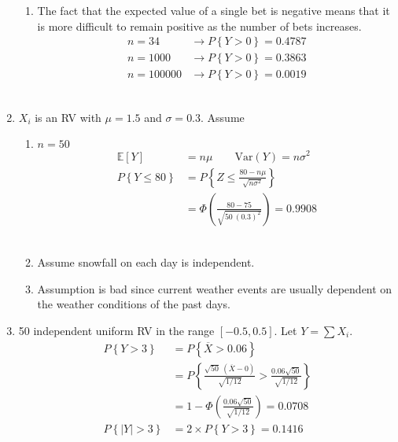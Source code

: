 \begin{enumerate}
\begin{enumerate}
			\item The fact that the expected value of a single bet is negative means that it is more difficult to remain positive as the number of bets increases.
			\begin{align}
				n = 34 &\to P \left\{ Y > 0 \right\} = 0.4787 \nonumber \\
				n = 1000 &\to P \left\{ Y > 0 \right\} = 0.3863 \nonumber \\
				n = 100000 &\to P \left\{ Y > 0 \right\} = 0.0019 \nonumber
			\end{align}\\
		\end{enumerate}
	 
	
	\item $ X_i $ is an RV with $ \mu = 1.5 $ and $ \sigma = 0.3 $. Assume \\
	
		\begin{enumerate}
			\item $ n = 50 $
			\begin{align}
				\mathbb{E}[Y] &= n\mu \qquad \mathrm{Var}(Y) = n\sigma^2 \nonumber \\
				P \left\{ Y \leq 80 \right\} &= P \left\{Z \leq \frac{80 - n\mu}{\sqrt{n\sigma^2}} \right\} \nonumber \\
				&= \Phi \left(\frac{80 - 75}{\sqrt{50\ (0.3)^2}}\right) = 0.9908
			\end{align}\\
			
			\item Assume snowfall on each day is independent.\\
			
			\item Assumption is bad since current weather events are usually dependent on the weather conditions of the past days.\\
			
		\end{enumerate}
	 
	
	\item 50 independent uniform RV in the range $ [-0.5, 0.5] $. Let $ Y = \sum X_i  $. \\
	
		\begin{align}
			P \left\{Y > 3 \right\} &= P \left\{ \overline{X} > 0.06 \right\} \nonumber \\
			&= P \left\{ \frac{\sqrt{50}\ (\overline{X} - 0)}{\sqrt{1/12}}> \frac{0.06 \sqrt{50}}{\sqrt{1/12}} \right\} \nonumber \\
			&= 1 - \Phi\left( \frac{0.06 \sqrt{50}}{\sqrt{1/12}} \right) = 0.0708 \nonumber \\
			P \left\{|Y| > 3 \right\} &= 2 \times P \left\{Y > 3 \right\} = 0.1416
		\end{align}\\
	

\end{enumerate}
